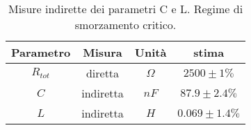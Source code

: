 \begin{table}[H]
\begin{center}
\begin{tabular}{|c|c|c|c|}
\hline

Parametro & Misura & Unità & stima \\ \hline

$R_{tot}$ & diretta & $\Omega$ & $2500\pm1\%$ \\ 

$C$ & indiretta & $nF$ & $87.9\pm2.4\%$ \\ 

$L$ & indiretta & $H$ & $0.069\pm1.4\%$ \\ 

\hline
\end{tabular}
\end{center}
\caption{
Misure indirette dei parametri C e L.
Regime di smorzamento critico.
}
\label{C4_P1_critico_fit}
\end{table}